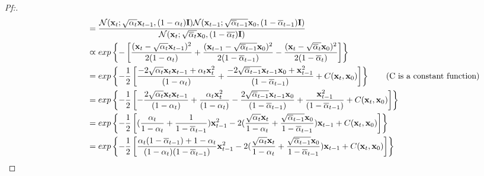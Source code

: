 \documentclass{article}
\begin{document}
\begin{proof}[\textit{Pf:}]
\begin{align}
        &\qquad\qquad\quad\,\,\,\,\, = \frac{\mathcal{N}(\mathbf{x}_t;\sqrt{\alpha_t}\mathbf{x}_{t-1}, (1-\alpha_t)\mathbf{I})\mathcal{N}(\mathbf{x}_{t-1};\sqrt{\overline{\alpha}_{t-1}}\mathbf{x}_{0}, (1-\overline{\alpha}_{t-1})\mathbf{I})}
            {\mathcal{N}(\mathbf{x}_t;\sqrt{\overline{\alpha}_{t}}\mathbf{x}_{0}, (1-\overline{\alpha_{t}})\mathbf{I})} \notag \\
        &\qquad\qquad\quad\,\,\,\,\, \varpropto exp\left\{ -\left[ \frac{(\mathbf{x}_t-\sqrt{\alpha_t}\mathbf{x}_{t-1})^2}{2(1-\alpha_t)}
        + \frac{(\mathbf{x}_{t-1}-\sqrt{\overline{\alpha}_{t-1}}\mathbf{x}_{0})^2}{2(1-\overline{\alpha}_{t-1})}
        - \frac{(\mathbf{x}_t-\sqrt{\overline{\alpha}_t}\mathbf{x}_{0})^2}{2(1-\overline{\alpha}_t)} \right] \right\} \notag \\
        &\qquad\qquad\quad\,\,\,\,\, = exp\left\{ -\frac{1}{2}\left[ \frac{-2\sqrt{\alpha_t}\mathbf{x}_t\mathbf{x}_{t-1} + \alpha_t\mathbf{x}_t^2}{(1-\alpha_t)}
        + \frac{-2\sqrt{\overline{\alpha}_{t-1}}\mathbf{x}_{t-1}\mathbf{x}_{0} + \mathbf{x}_{t-1}^2}{(1-\overline{\alpha}_{t-1})}
        + C(\mathbf{x}_t, \mathbf{x}_0) \right] \right\} \tag{C is a constant function} \\
        &\qquad\qquad\quad\,\,\,\,\, = exp\left\{ -\frac{1}{2}\left[ - \frac{2\sqrt{\alpha_t}\mathbf{x}_t\mathbf{x}_{t-1}}{(1-\alpha_t)}
        + \frac{\alpha_t\mathbf{x}_t^2}{(1-\alpha_t)}
        - \frac{2\sqrt{\overline{\alpha}_{t-1}}\mathbf{x}_{t-1}\mathbf{x}_{0}}{(1-\overline{\alpha}_{t-1})}
        + \frac {\mathbf{x}_{t-1}^2}{(1-\overline{\alpha}_{t-1})}
        + C(\mathbf{x}_t, \mathbf{x}_0) \right] \right\} \notag\\
        &\qquad\qquad\quad\,\,\,\,\, = exp\left\{ -\frac{1}{2}\left[ (\frac{\alpha_t}{1-\alpha_t} + \frac{1}{1-\overline{\alpha}_{t-1}}) \mathbf{x}_{t-1}^2
        - 2(\frac{\sqrt{\alpha_{t}}\mathbf{x}_{t}}{1-\alpha_{t}} + \frac{\sqrt{\overline{\alpha}_{t-1}}\mathbf{x}_{0}}{1-\overline{\alpha}_{t-1}})\mathbf{x}_{t-1}
        + C(\mathbf{x}_t, \mathbf{x}_0) \right] \right\} \notag\\
        &\qquad\qquad\quad\,\,\,\,\, = exp\left\{ -\frac{1}{2}\left[ \frac{\alpha_t(1-\overline{\alpha}_{t-1})+1-\alpha_t}{(1-\alpha_t)(1-\overline{\alpha}_{t-1})} \mathbf{x}_{t-1}^2
        - 2(\frac{\sqrt{\alpha_{t}}\mathbf{x}_{t}}{1-\alpha_{t}} + \frac{\sqrt{\overline{\alpha}_{t-1}}\mathbf{x}_{0}}{1-\overline{\alpha}_{t-1}})\mathbf{x}_{t-1}
        + C(\mathbf{x}_t, \mathbf{x}_0) \right] \right\} \notag\\

\end{align}
\end{proof}
\end{document}
